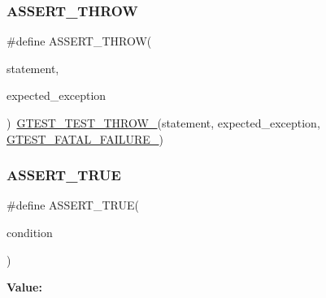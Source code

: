 \subsubsection{\texorpdfstring{ASSERT\_THROW}{ASSERT\_THROW}}
{\footnotesize\ttfamily \#define A\+S\+S\+E\+R\+T\+\_\+\+T\+H\+R\+OW(\begin{DoxyParamCaption}\item[{}]{statement,  }\item[{}]{expected\+\_\+exception }\end{DoxyParamCaption})~\mbox{\hyperlink{_obj__test_2lib_2googletest-release-1_88_81_2googletest_2include_2gtest_2internal_2gtest-internal_8h_a3f71db93eaf30b0cfca9612b9ac32106}{G\+T\+E\+S\+T\+\_\+\+T\+E\+S\+T\+\_\+\+T\+H\+R\+O\+W\+\_\+}}(statement, expected\+\_\+exception, \mbox{\hyperlink{_obj__test_2lib_2googletest-release-1_88_81_2googletest_2include_2gtest_2internal_2gtest-internal_8h_a0f9a4c3ea82cc7bf4478eaffdc168358}{G\+T\+E\+S\+T\+\_\+\+F\+A\+T\+A\+L\+\_\+\+F\+A\+I\+L\+U\+R\+E\+\_\+}})}

\mbox{\label{_obj__test_2lib_2googletest-master_2googletest_2include_2gtest_2gtest_8h_ae9244bfbda562e8b798789b001993fa5}} 
\subsubsection{\texorpdfstring{ASSERT\_TRUE}{ASSERT\_TRUE}}
{\footnotesize\ttfamily \#define A\+S\+S\+E\+R\+T\+\_\+\+T\+R\+UE(\begin{DoxyParamCaption}\item[{}]{condition }\end{DoxyParamCaption})}

{\bfseries Value\+:}
\begin{DoxyCode}{0}

\end{DoxyCode}
\mbox{\label{_obj__test_2lib_2googletest-master_2googletest_2include_2gtest_2gtest_8h_a9be43f44d148e8a8d6a89c864bf4e461}} 

